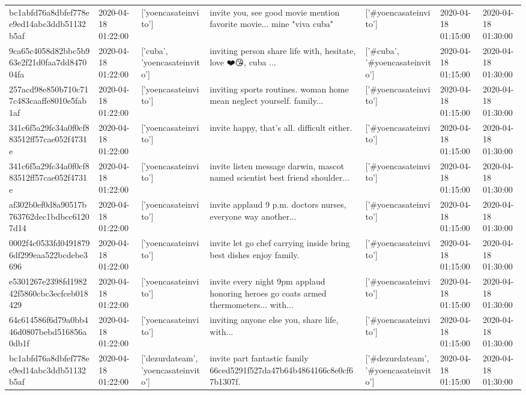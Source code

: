 \begin{tabular}{lllllll}
bc1abfd76a8dbfef778ee9ed14abc3ddb51132b5af & 2020-04-18 01:22:00 & ['yoencasateinvito'] & invite you, see good movie mention favorite movie... mine "viva cuba" & ['#yoencasateinvito'] & 2020-04-18 01:15:00 & 2020-04-18 01:30:00 \\
9ca65c4058d82bbc5b963e2f21d0faa7dd847004fa & 2020-04-18 01:22:00 & ['cuba', 'yoencasateinvito'] & inviting person share life with, hesitate, love ❤️😘, cuba ... & ['#cuba', '#yoencasateinvito'] & 2020-04-18 01:15:00 & 2020-04-18 01:30:00 \\
257acd98e850b710c717c483caaffe8010e5fab1af & 2020-04-18 01:22:00 & ['yoencasateinvito'] & inviting sports routines. woman home mean neglect yourself. family... & ['#yoencasateinvito'] & 2020-04-18 01:15:00 & 2020-04-18 01:30:00 \\
341c6f5a29fc34a0f0cf883512ff57cae052f4731e & 2020-04-18 01:22:00 & ['yoencasateinvito'] & invite happy, that's all. difficult either. & ['#yoencasateinvito'] & 2020-04-18 01:15:00 & 2020-04-18 01:30:00 \\
341c6f5a29fc34a0f0cf883512ff57cae052f4731e & 2020-04-18 01:22:00 & ['yoencasateinvito'] & invite listen message darwin, mascot named scientist best friend shoulder... & ['#yoencasateinvito'] & 2020-04-18 01:15:00 & 2020-04-18 01:30:00 \\
af302b0ef0d8a90517b763762dec1bdbcc61207d14 & 2020-04-18 01:22:00 & ['yoencasateinvito'] & invite applaud 9 p.m. doctors nurses, everyone way another... & ['#yoencasateinvito'] & 2020-04-18 01:15:00 & 2020-04-18 01:30:00 \\
0002f4c0533fd04918796df299eaa522bcdebe3696 & 2020-04-18 01:22:00 & ['yoencasateinvito'] & invite let go chef carrying inside bring best dishes enjoy family. & ['#yoencasateinvito'] & 2020-04-18 01:15:00 & 2020-04-18 01:30:00 \\
e5301267e2398fd198242f5860cbc3ecfceb018429 & 2020-04-18 01:22:00 & ['yoencasateinvito'] & invite every night 9pm applaud honoring heroes go coats armed thermometers... with... & ['#yoencasateinvito'] & 2020-04-18 01:15:00 & 2020-04-18 01:30:00 \\
64c614586f6d79a0bb446d0807bebd516856a0db1f & 2020-04-18 01:22:00 & ['yoencasateinvito'] & inviting anyone else you, share life, with... & ['#yoencasateinvito'] & 2020-04-18 01:15:00 & 2020-04-18 01:30:00 \\
bc1abfd76a8dbfef778ee9ed14abc3ddb51132b5af & 2020-04-18 01:22:00 & ['dezurdateam', 'yoencasateinvito'] & invite part fantastic family 66ced5291f527da47b64b4864166c8e0cf67b1307f. & ['#dezurdateam', '#yoencasateinvito'] & 2020-04-18 01:15:00 & 2020-04-18 01:30:00 \\

\end{tabular}

